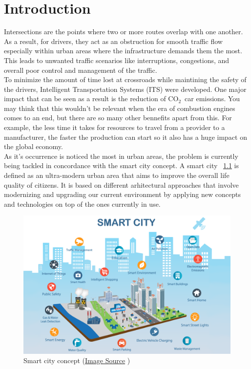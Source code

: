 \documentclass[17pt]{report}
\newcommand{\coo}{\ensuremath{\mathrm{CO_2}}}
\begin{document}
\chapter{Introduction}
\indent \indent
Intersections are the points where two or more
routes overlap with one another. As a result, for drivers, 
they act as an obstruction for smooth traffic
flow especially within urban areas where the
infrastructure demands them the most. This leads to unwanted 
traffic scenarios like interruptions, congestions, and
overall poor control and management of the traffic.\\
\indent \indent
To minimize the amount of time lost at crossroads while
maintining the safety of the drivers, Intelligent
Transportation Systems (ITS) were developed.
One major impact that can be seen as a result is the
reduction of \coo\ car emissions. You may think that
this wouldn't be relevant when the era of combustion
engines comes to an end, but there are so many other
bennefits apart from this. For example, the less time
it takes for resources to travel from a provider to a
manufacturer, the faster the production can start so
it also has a huge impact on the global economy.\\
\indent \indent
As it's occurrence is noticed the most in urban areas,
the problem is currently being tackled in concordance 
with the smart city concept. A smart city ~\ref{fig:SmartCity} is defined as an 
ultra-modern urban area that aims to improve the overall life
quality of citizens. It is based on different arhitectural
approaches that involve modernizing and upgrading our current 
environment by applying new concepts and technologies on top
of the ones currently in use.

\begin{figure}[h!]
    \includegraphics[width=\textwidth]{SmartCity.png}
    \caption{Smart city concept 
    (\href{https://aliga.sk/en/what-the-heck-is-a-smart-city/}{Image Source} \textcopyright)}
    \label{fig:SmartCity}
\end{figure}
\end{document}
